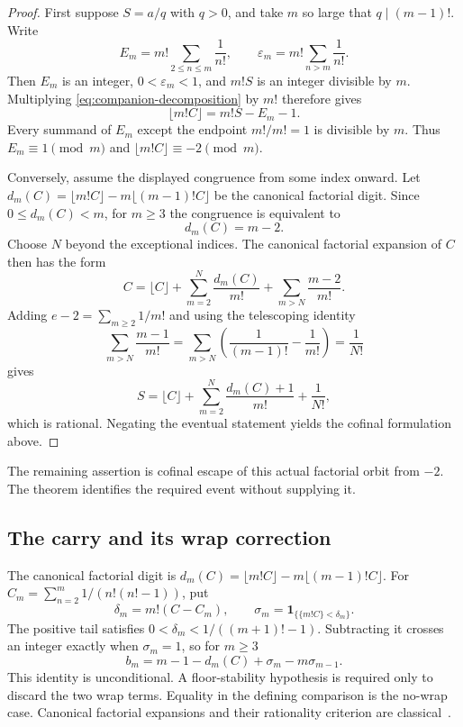 \documentclass[11pt]{article}
\newcommand{\Ser}{S}
\begin{document}
\begin{proof}
First suppose $\Ser=a/q$ with $q>0$, and take $m$ so large that
$q\mid(m-1)!$.  Write
\[
 E_m=m!\sum_{2\le n\le m}\frac1{n!},
 \qquad
 \varepsilon_m=m!\sum_{n>m}\frac1{n!}.
\]
Then $E_m$ is an integer, $0<\varepsilon_m<1$, and $m!\Ser$ is an integer
divisible by $m$.  Multiplying \eqref{eq:companion-decomposition} by $m!$
therefore gives
\[
 \lfloor m!C\rfloor=m!\Ser-E_m-1.
\]
Every summand of $E_m$ except the endpoint $m!/m!=1$ is divisible by $m$.
Thus $E_m\equiv1\pmod m$ and
$\lfloor m!C\rfloor\equiv-2\pmod m$.

Conversely, assume the displayed congruence from some index onward.  Let
$d_m(C)=\lfloor m!C\rfloor-m\lfloor(m-1)!C\rfloor$ be the canonical
factorial digit.  Since $0\le d_m(C)<m$, for $m\ge3$ the congruence is
equivalent to
\[
 d_m(C)=m-2.
\]
Choose $N$ beyond the exceptional indices.  The canonical factorial
expansion of $C$ then has the form
\[
 C=\lfloor C\rfloor+
   \sum_{m=2}^{N}\frac{d_m(C)}{m!}+
   \sum_{m>N}\frac{m-2}{m!}.
\]
Adding $e-2=\sum_{m\ge2}1/m!$ and using the telescoping identity
\[
 \sum_{m>N}\frac{m-1}{m!}
 =\sum_{m>N}\left(\frac1{(m-1)!}-\frac1{m!}\right)
 =\frac1{N!}
\]
gives
\[
 \Ser=\lfloor C\rfloor+
   \sum_{m=2}^{N}\frac{d_m(C)+1}{m!}+\frac1{N!},
\]
which is rational.  Negating the eventual statement yields the cofinal
formulation above.
\end{proof}

\begin{remark}\label{bdry:companion-orbit-nonconcentration}
The remaining assertion is cofinal escape of this actual factorial orbit
from $-2$.  The theorem identifies the required event without supplying it.
\end{remark}

\subsection{The carry and its wrap correction}\label{sec:digits}
The canonical factorial digit is
$d_m(C)=\lfloor m!C\rfloor-m\lfloor(m-1)!C\rfloor$.
For $C_m=\sum_{n=2}^m1/(n!(n!-1))$, put
\[
\delta_m=m!(C-C_m),\qquad
\sigma_m=\mathbf1_{\{\{m!C\}<\delta_m\}}.
\]
The positive tail satisfies $0<\delta_m<1/((m+1)!-1)$.
Subtracting it crosses an integer exactly when $\sigma_m=1$, so for $m\ge3$
\begin{equation}
b_m=m-1-d_m(C)+\sigma_m-m\sigma_{m-1}.
\label{eq:companion-wrap}
\end{equation}
This identity is unconditional.  A floor-stability hypothesis is required
only to discard the two wrap terms.  Equality in the defining comparison is
the no-wrap case.  Canonical factorial expansions and their rationality
criterion are classical~\cite{cantor1869,galambos1976}.
\end{document}
